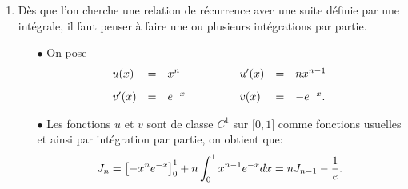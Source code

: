 \documentclass[a4paper, 11pt,reqno]{article}
\begin{document}
\begin{correction}
\begin{enumerate}
\begin{itemize}
\begin{itemize}
\begin{itemize}
					                  \item[$\circ$] $0\leq 1$.
					                  \item[$\circ$] Pour tout $x\in\lbrack 0,1\rbrack$: $x^ne^{-1}\leq f_n(x) \leq x^n$.
				                  \end{itemize}
				                  Ainsi d'apr\`{e}s le th\'eor\`{e}me de croissance de l'int\'egrale, on a:
				                  $$\int_0^1 x^n e^{-1}dx \leq J_n\leq \int_0^1 x^n dx\Leftrightarrow \ddp\frac{e^{-1}}{n+1}\leq J_n \leq \ddp\frac{1}{n+1}.$$
				            \item[$\star$] Utilisation du th\'eor\`{e}me des gendarmes: on a:
				                  \begin{itemize}
					                  \item[$\circ$] Pour tout $n\in\N$: $\ddp\frac{e^{-1}}{n+1}\leq J_n \leq \ddp\frac{1}{n+1}$.
					                  \item[$\circ$] $\lim\limits_{n\to +\infty} \ddp\frac{e^{-1}}{n+1}=\lim\limits_{n\to +\infty} \ddp\frac{1}{n+1}=0$ par proprit\'et\'e sur les quotient s de limites.
				                  \end{itemize}
				                  Ainsi d'apr\`{e}s le th\'eor\`{e}me des gendarmes, on a: $\lim\limits_{n\to +\infty} J_n=0$.
			            \end{itemize}
		      \end{itemize}
		\item D\`{e}s que l'on cherche une relation de r\'ecurrence avec une suite d\'efinie par une int\'egrale, il faut penser \`{a} faire une ou plusieurs int\'egrations par partie.
		      \begin{itemize}
			      \item[$\bullet$] On pose
			            $$\begin{array}{lllllll}
					            u(x)          & = & x^n    & \hspace{1cm} & u^{\prime}(x) & = & nx^{n-1}\vsec \\
					            v^{\prime}(x) & = & e^{-x} & \hspace{1cm} & v(x)          & = & -e^{-x}.
				            \end{array}$$
			      \item[$\bullet$] Les fonctions $u$ et $v$ sont de classe $C^1$ sur $\lbrack 0,1\rbrack$ comme fonctions usuelles et ainsi par int\'egration par partie, on obtient que:
			            $$J_n=\left\lbrack -x^n e^{-x}\right\rbrack_0^1+n\int_0^1 x^{n-1}e^{-x}dx=nJ_{n-1}-\displaystyle\frac{1}{e}.$$

\end{itemize}
\end{enumerate}
\end{correction}
\end{document}
